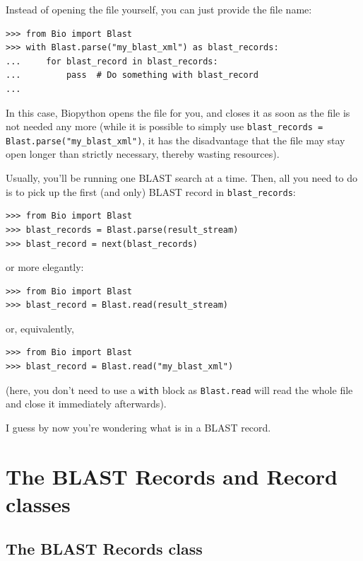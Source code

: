 Instead of opening the file yourself, you can just provide the file name:
\begin{verbatim}
>>> from Bio import Blast
>>> with Blast.parse("my_blast_xml") as blast_records:
...     for blast_record in blast_records:
...         pass  # Do something with blast_record
...
\end{verbatim}
In this case, Biopython opens the file for you, and closes it as soon as the file is not needed any more (while it is possible to simply use \verb|blast_records = Blast.parse("my_blast_xml")|, it has the disadvantage that the file may stay open longer than strictly necessary, thereby wasting resources).

Usually, you'll be running one BLAST search at a time. Then, all you need
to do is to pick up the first (and only) BLAST record in \verb|blast_records|:
\begin{verbatim}
>>> from Bio import Blast
>>> blast_records = Blast.parse(result_stream)
>>> blast_record = next(blast_records)
\end{verbatim}
\noindent or more elegantly:
\begin{verbatim}
>>> from Bio import Blast
>>> blast_record = Blast.read(result_stream)
\end{verbatim}
or, equivalently,
\begin{verbatim}
>>> from Bio import Blast
>>> blast_record = Blast.read("my_blast_xml")
\end{verbatim}
(here, you don't need to use a \verb|with| block as \verb|Blast.read| will read the whole file and close it immediately afterwards).

I guess by now you're wondering what is in a BLAST record.

\section{The BLAST Records and Record classes}

\subsection{The BLAST Records class}
\label{subsec:blast-records}

